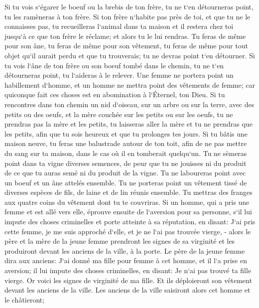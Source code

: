 \verse Si tu vois s`égarer le boeuf ou la brebis de ton frère, tu ne t`en détourneras point, tu les ramèneras à ton frère. 
\verse Si ton frère n`habite pas près de toi, et que tu ne le connaisses pas, tu recueilleras l`animal dans ta maison et il restera chez toi jusqu`à ce que ton frère le réclame; et alors tu le lui rendras. 
\verse Tu feras de même pour son âne, tu feras de même pour son vêtement, tu feras de même pour tout objet qu`il aurait perdu et que tu trouverais; tu ne devras point t`en détourner. 
\verse Si tu vois l`âne de ton frère ou son boeuf tombé dans le chemin, tu ne t`en détourneras point, tu l`aideras à le relever. 
\verse Une femme ne portera point un habillement d`homme, et un homme ne mettra point des vêtements de femme; car quiconque fait ces choses est en abomination à l`Éternel, ton Dieu. 
\verse Si tu rencontres dans ton chemin un nid d`oiseau, sur un arbre ou sur la terre, avec des petits ou des oeufs, et la mère couchée sur les petits ou sur les oeufs, tu ne prendras pas la mère et les petits, 
\verse tu laisseras aller la mère et tu ne prendras que les petits, afin que tu sois heureux et que tu prolonges tes jours. 
\verse Si tu bâtis une maison neuve, tu feras une balustrade autour de ton toit, afin de ne pas mettre du sang sur ta maison, dans le cas où il en tomberait quelqu`un. 
\verse Tu ne sèmeras point dans ta vigne diverses semences, de peur que tu ne jouisses ni du produit de ce que tu auras semé ni du produit de la vigne. 
\verse Tu ne laboureras point avec un boeuf et un âne attelés ensemble. 
\verse Tu ne porteras point un vêtement tissé de diverses espèces de fils, de laine et de lin réunis ensemble. 
\verse Tu mettras des franges aux quatre coins du vêtement dont tu te couvriras. 
\verse Si un homme, qui a pris une femme et est allé vers elle, éprouve ensuite de l`aversion pour sa personne, 
\verse s`il lui impute des choses criminelles et porte atteinte à sa réputation, en disant: J`ai pris cette femme, je me suis approché d`elle, et je ne l`ai pas trouvée vierge, - 
\verse alors le père et la mère de la jeune femme prendront les signes de sa virginité et les produiront devant les anciens de la ville, à la porte. 
\verse Le père de la jeune femme dira aux anciens: J`ai donné ma fille pour femme à cet homme, et il l`a prise en aversion; 
\verse il lui impute des choses criminelles, en disant: Je n`ai pas trouvé ta fille vierge. Or voici les signes de virginité de ma fille. Et ils déploieront son vêtement devant les anciens de la ville. 
\verse Les anciens de la ville saisiront alors cet homme et le châtieront; 
